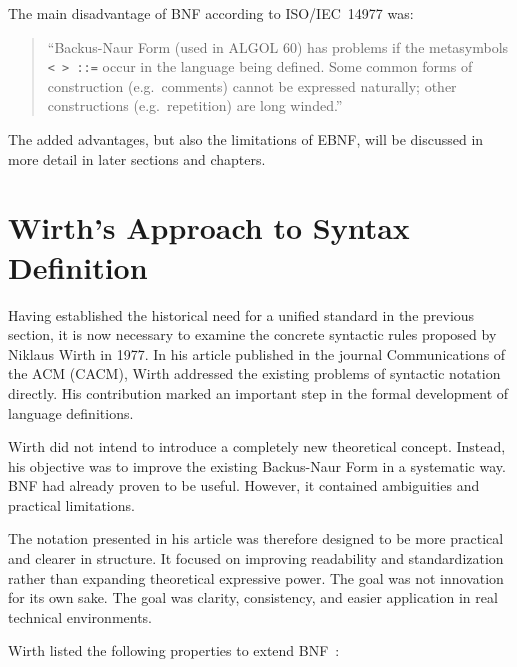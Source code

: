 The main disadvantage of BNF according to ISO/IEC~14977 was:

\begin{quote}
``Backus-Naur Form (used in ALGOL 60) has problems if the metasymbols \texttt{< > ::=} occur in the language being defined. Some common forms of construction (e.g.\ comments) cannot be expressed naturally; other constructions (e.g.\ repetition) are long winded.''~\cite[p.~VII]{ISO/IEC149771996InformationBNF}
\end{quote}


The added advantages, but also the limitations of EBNF, will be discussed in more detail in later sections and chapters.

\section{Wirth's Approach to Syntax Definition}

Having established the historical need for a unified standard in the previous section, it is now necessary to examine the concrete syntactic rules proposed by Niklaus Wirth in 1977. In his article published in the journal Communications of the ACM (CACM), Wirth addressed the existing problems of syntactic notation directly. His contribution marked an important step in the formal development of language definitions.

Wirth did not intend to introduce a completely new theoretical concept. Instead, his objective was to improve the existing Backus-Naur Form in a systematic way. BNF had already proven to be useful. However, it contained ambiguities and practical limitations.

The notation presented in his article was therefore designed to be more practical and clearer in structure. It focused on improving readability and standardization rather than expanding theoretical expressive power. The goal was not innovation for its own sake. The goal was clarity, consistency, and easier application in real technical environments.

Wirth listed the following properties to extend BNF~\cite{Wirth1977WhatDefinitions}:

